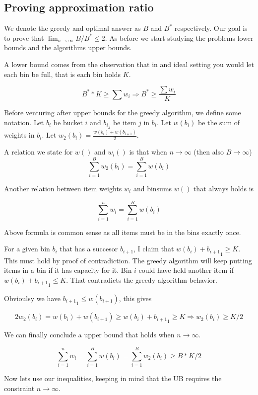\documentclass[a4paper,11pt]{article}
\begin{document}
\subsection{Proving approximation ratio}

We denote the greedy and optimal answer as $B$ and $B^*$ respectively.
Our goal is to prove that $\lim_{n \to \infty} B/B^* \leq 2$. As before we
start studying the problems lower bounds and the algorithms upper bounds.

A lower bound comes from the observation that in and ideal setting you would
let each bin be full, that is each bin holds $K$.

\[
 B^* * K \geq \sum w_i \Rightarrow B^* \geq \frac{\sum w_i}{K}
\]

Before venturing after upper bounds for the greedy algorithm, we define some
notation.
Let ${b_i}$ be bucket $i$ and ${b_i}_j$ be item $j$ in ${b_i}$.
Let $w({b_i})$ be the sum of weights in ${b_i}$.
Let $w_2({b_i}) = \frac{w({b_i}) + w(b_{i+1})}{2}$.

A relation we state for $w()$ and $w_i()$ is that when $n \to \infty$ (then
also $B \to \infty$)
\[
 \sum_{i=1}^{B} w_2({b_i}) = \sum_{i=1}^{B} w({b_i})
\]

Another relation between item weights $w_i$ and binsums $w()$ that always holds
is

\[
 \sum_{i=1}^{n} w_i = \sum_{i=1}^{B} w({b_i})
\]

Above formula is common sense as all items must be in the bins exactly once.

For a given bin ${b_i}$ that has a succesor $b_{i+1}$, I claim that
$w({b_i}) + {b_{i+1}}_1 \geq K$. This must hold by proof of contradiction.
The greedy algorithm will keep putting items in a bin if it has capacity for it.
Bin $i$ could have
held another item if $w({b_i}) + {b_{i+1}}_1 \leq K$. That contradicts the greedy
algorithm behavior.

Obvioulsy we have ${b_{i+1}}_1 \leq w(b_{i+1})$, this gives

\[
 2w_2({b_i}) = w({b_i}) + w(b_{i+1}) \geq w({b_i}) + {b_{i+1}}_1 \geq K
 \Rightarrow w_2({b_i}) \geq K/2
\]

We can finally conclude a upper bound that holds when $n \to \infty$.

\[
 \sum_{i=1}^{n} w_i = \sum_{i=1}^{B} w({b_i}) = \sum_{i=1}^{B} w_2({b_i}) \geq B*K/2
\]

Now lets use our inequalities, keeping in mind that the UB requires the
constraint $n \to \infty$.
\end{document}
